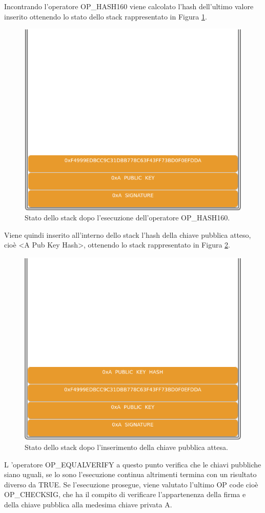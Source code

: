 Incontrando l’operatore OP\_HASH160 viene calcolato l’hash dell’ultimo valore inserito ottenendo lo stato dello stack rappresentato in Figura \ref{fig:stackp2pkh03}.

\begin{figure}[h]
\begin{center}
\includegraphics[width=0.6\columnwidth]{images/script/p2pkh/3.png}
\end{center}
\caption{Stato dello stack dopo l’esecuzione dell’operatore OP\_HASH160.}
\label{fig:stackp2pkh03}
\end{figure}

Viene quindi inserito all’interno dello stack l’hash della chiave pubblica atteso, cioè <A Pub Key Hash>, ottenendo lo stack rappresentato in Figura \ref{fig:stackp2pkh04}.

\begin{figure}[h]
\begin{center}
\includegraphics[width=0.6\columnwidth]{images/script/p2pkh/4.png}
\end{center}
\caption{Stato dello stack dopo l’inserimento della chiave pubblica attesa.}
\label{fig:stackp2pkh04}
\end{figure}

L ’operatore OP\_EQUALVERIFY a questo punto verifica che le chiavi pubbliche siano uguali, se lo sono l’esecuzione continua altrimenti termina con un risultato diverso da TRUE. Se l’esecuzione prosegue, viene valutato l’ultimo OP code cioè OP\_CHECKSIG, che ha il compito di verificare l’appartenenza della firma e della chiave pubblica alla medesima chiave privata A.

